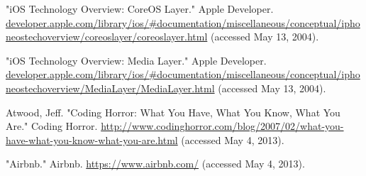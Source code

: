 \documentclass[10pt]{article}
\begin{document}
\begin{multicols}{2}
\begin{thebibliography}{99}
"iOS Technology Overview: CoreOS Layer." Apple Developer. \url{developer.apple.com/library/ios/#documentation/miscellaneous/conceptual/iphoneostechoverview/coreoslayer/coreoslayer.html} (accessed May 13, 2004).

"iOS Technology Overview: Media Layer." Apple Developer. \url{developer.apple.com/library/ios/#documentation/miscellaneous/conceptual/iphoneostechoverview/MediaLayer/MediaLayer.html} (accessed May 13, 2004).

Atwood, Jeff. "Coding Horror: What You Have, What You Know, What You Are." Coding Horror. \url{http://www.codinghorror.com/blog/2007/02/what-you-have-what-you-know-what-you-are.html} (accessed May 4, 2013).

"Airbnb." Airbnb. \url{https://www.airbnb.com/} (accessed May 4, 2013).
\end{thebibliography}


\end{multicols}
\end{document}
